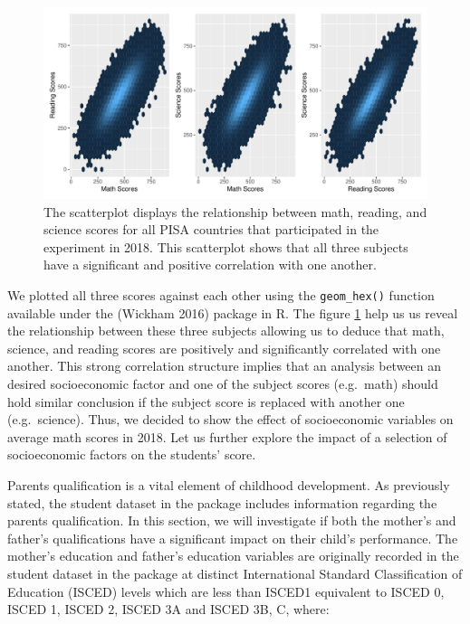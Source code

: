 \begin{figure}[H]
\includegraphics[width=1\linewidth]{learningtower_files/figure-latex/corr-plot-1} \caption{The scatterplot displays the relationship between math, reading, and science scores for all PISA countries that participated in the experiment in 2018. This scatterplot shows that all three subjects have a significant and positive correlation with one another.}\label{fig:corr-plot}
\end{figure}

We plotted all three scores against each other using the \texttt{geom\_hex()} function available under the  (Wickham 2016) package in R. The figure \ref{fig:corr-plot} help us us reveal the relationship between these three subjects allowing us to deduce that math, science, and reading scores are positively and significantly correlated with one another. This strong correlation structure implies that an analysis between an desired socioeconomic factor and one of the subject scores (e.g.~math) should hold similar conclusion if the subject score is replaced with another one (e.g.~science). Thus, we decided to show the effect of socioeconomic variables on average math scores in 2018. Let us further explore the impact of a selection of socioeconomic factors on the students' score.

Parents qualification is a vital element of childhood development. As previously stated, the student dataset in the package includes information regarding the parents qualification. In this section, we will investigate if both the mother's and father's qualifications have a significant impact on their child's performance. The mother's education and father's education variables are originally recorded in the student dataset in the  package at distinct International Standard Classification of Education (ISCED) levels which are less than ISCED1 equivalent to ISCED 0, ISCED 1, ISCED 2, ISCED 3A and ISCED 3B, C, where:

